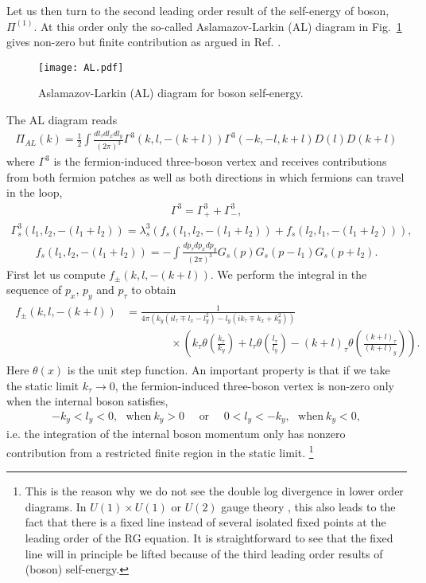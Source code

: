 \documentclass[prx,amsmath,amssymb, notitlepage, onecolumn,
nofootinbib,
superscriptaddress,
longbibliography
]{revtex4-1}
\newcommand{\beq}{\begin{eqnarray}}
\newcommand{\eeq}{\end{eqnarray}}
\begin{document}
Let us then turn to the second leading order result of the self-energy of boson, $\Pi^{(1)}$. At this order only the so-called Aslamazov-Larkin (AL) diagram \cite{Aslamazov1968} in Fig.~\ref{FD: AL} gives non-zero but finite contribution as argued in Ref. \cite{Mross2010}.
\begin{figure}[h]
\centering
\texttt{[image: AL.pdf]}
\caption{Aslamazov-Larkin (AL) diagram for boson self-energy.}
\label{FD: AL}
\end{figure}
%
The AL diagram reads \cite{Metlitski2010}
\beq\label{eq: AL pre}
\Pi_{AL}(k) = \frac{1}{2}\int\frac{dl_\tau dl_x dl_y}{(2\pi)^3}\Gamma^3(k, l, -(k+l))\Gamma^3(-k, -l, k+l)D(l)D(k+l)
\eeq
where $\Gamma^3$ is the fermion-induced three-boson vertex and receives contributions from 
both fermion patches as well as both directions in which fermions can travel in the loop,
\beq
\Gamma^3 = \Gamma^3_+ + \Gamma^3_-,
\eeq
\beq
\Gamma^3_s(l_1, l_2, -(l_1+l_2)) = \lambda_s^3\left(f_s(l_1, l_2, -(l_1+l_2)) + f_s(l_2, l_1, -(l_1+l_2))\right),
\eeq
\beq
f_s(l_1, l_2, -(l_1+l_2)) = -\int \frac{dp_\tau dp_x dp_y}{(2\pi)^3}G_s(p) G_s(p - l_1) G_s(p+l_2).
\eeq
%
First let us compute $f_\pm(k, l, -(k+l))$. We perform the integral in the sequence of $p_x$, $p_y$ and $p_\tau$ 
to obtain
\beq
\begin{split}
f_\pm(k, l, -(k+l)) 
&=\frac{1}{4\pi\left( k_y(il_\tau\mp l_x-l_y^2)-l_y(ik_\tau \mp k_x+k_y^2)\right)}\\
&\quad\quad\quad\quad\times\left(k_\tau  \theta\left(\frac{k_\tau }{k_y}\right) + l_\tau \theta\left(\frac{l_\tau}{l_y}\right) - (k+l)_\tau \theta\left(\frac{(k+l)_\tau}{(k+l)_y}\right)\right).
\end{split}
\eeq
Here $\theta(x)$ is the unit step function. An important property is that if we take the static limit $k_\tau\rightarrow0$, the fermion-induced three-boson vertex is non-zero only when the internal boson satisfies,
\beq\label{eq: 3-boson kinetic constraint}
-k_y<l_y<0,~~~\text{when}~k_y>0~~~~~~\text{or}~~~~~~0<l_y<-k_y,~~~\text{when}~k_y<0,
\eeq
i.e. the integration of the internal boson momentum only has nonzero contribution from a restricted finite region in the static limit. \footnote{This is the reason why we do not see the double log divergence in lower order diagrams. In $U(1)\times U(1)$ or $U(2)$ gauge theory \cite{Zou2020}, this also leads to the fact that there is a fixed line instead of several isolated fixed points at the leading order of the RG equation. It is straightforward to see that the fixed line will in principle be lifted because of the third leading order results of (boson) self-energy.} 
\end{document}
